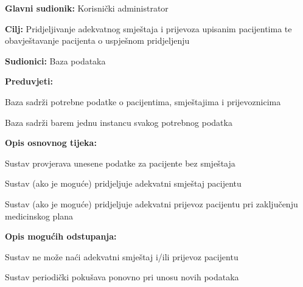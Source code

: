 					\noindent {}
					\begin{packed_item}
						\item \textbf{Glavni sudionik:} Korisnički administrator
						\item  \textbf{Cilj:} Pridjeljivanje adekvatnog smještaja i prijevoza upisanim pacijentima te obavještavanje pacijenta o uspješnom pridjeljenju
						\item  \textbf{Sudionici:} Baza podataka
						\item  \textbf{Preduvjeti:}
						\item[] \begin{packed_enum}
							\item Baza sadrži potrebne podatke o pacijentima, smještajima i prijevoznicima
							\item Baza sadrži barem jednu instancu svakog potrebnog podatka
						\end{packed_enum}
						
						\item  \textbf{Opis osnovnog tijeka:}
						\item[] \begin{packed_enum}
							\item Sustav provjerava unesene podatke za pacijente bez smještaja
							\item Sustav (ako je moguće) pridjeljuje adekvatni smještaj pacijentu
							\item Sustav (ako je moguće) pridjeljuje adekvatni prijevoz pacijentu pri zaključenju medicinskog plana
						\end{packed_enum}
						
						\item  \textbf{Opis mogućih odstupanja:}
						\item[] \begin{packed_item}
							\item[2.a] Sustav ne može naći adekvatni smještaj i/ili prijevoz pacijentu
							\item[] \begin{packed_enum}
								\item Sustav periodički pokušava ponovno pri unosu novih podataka
							\end{packed_enum}
						\end{packed_item}
					\end{packed_item}
					

